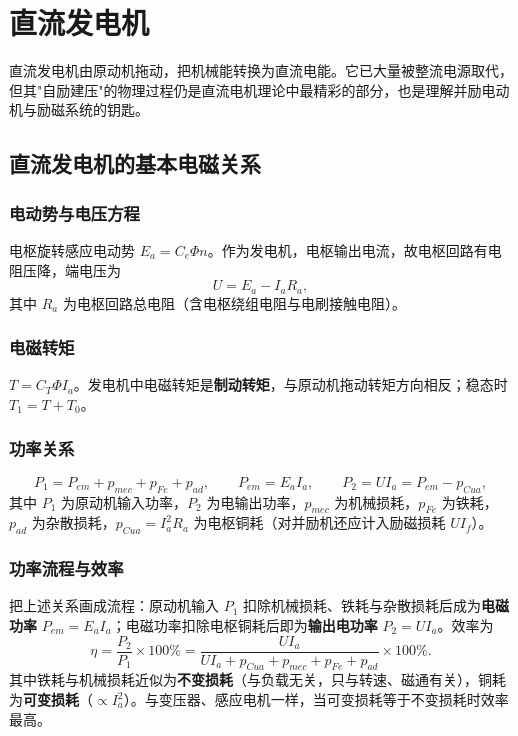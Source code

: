 \chapter{直流发电机}

直流发电机由原动机拖动，把机械能转换为直流电能。它已大量被整流电源取代，但其"自励建压"的物理过程仍是直流电机理论中最精彩的部分，也是理解并励电动机与励磁系统的钥匙。

\section{直流发电机的基本电磁关系}

\subsection{电动势与电压方程}
电枢旋转感应电动势 $E_a=C_e\Phi n$。作为发电机，电枢输出电流，故电枢回路有电阻压降，端电压为
\begin{equation}
U=E_a-I_aR_a ,
\end{equation}
其中 $R_a$ 为电枢回路总电阻（含电枢绕组电阻与电刷接触电阻）。

\subsection{电磁转矩}
$T=C_T\Phi I_a$。发电机中电磁转矩是\textbf{制动转矩}，与原动机拖动转矩方向相反；稳态时 $T_1=T+T_0$。

\subsection{功率关系}
\begin{equation}
P_1=P_{em}+p_{mec}+p_{Fe}+p_{ad},\qquad P_{em}=E_aI_a,\qquad P_2=UI_a=P_{em}-p_{Cu a},
\end{equation}
其中 $P_1$ 为原动机输入功率，$P_2$ 为电输出功率，$p_{mec}$ 为机械损耗，$p_{Fe}$ 为铁耗，$p_{ad}$ 为杂散损耗，$p_{Cua}=I_a^2R_a$ 为电枢铜耗（对并励机还应计入励磁损耗 $U I_f$）。

\subsection{功率流程与效率}
把上述关系画成流程：原动机输入 $P_1$ 扣除机械损耗、铁耗与杂散损耗后成为\textbf{电磁功率} $P_{em}=E_aI_a$；电磁功率扣除电枢铜耗后即为\textbf{输出电功率} $P_2=UI_a$。效率为
\begin{equation}
\eta=\frac{P_2}{P_1}\times100\%=\frac{UI_a}{UI_a+p_{Cua}+p_{mec}+p_{Fe}+p_{ad}}\times100\% .
\end{equation}
其中铁耗与机械损耗近似为\textbf{不变损耗}（与负载无关，只与转速、磁通有关），铜耗为\textbf{可变损耗}（$\propto I_a^2$）。与变压器、感应电机一样，当可变损耗等于不变损耗时效率最高。

